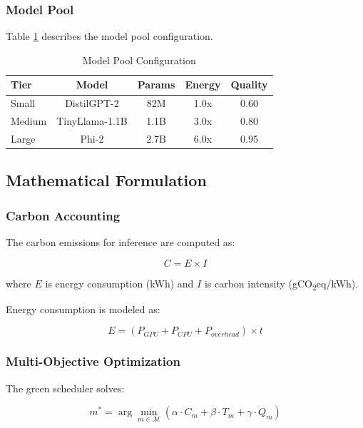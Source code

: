 \documentclass[conference]{IEEEtran}
\newcommand{\gco}{gCO\textsubscript{2}eq}
\begin{document}
\subsubsection{Model Pool}

Table \ref{tab:model_pool} describes the model pool configuration.

\begin{table}[h]
\centering
\caption{Model Pool Configuration}
\label{tab:model_pool}
\begin{tabular}{lcccc}
\toprule
\textbf{Tier} & \textbf{Model} & \textbf{Params} & \textbf{Energy} & \textbf{Quality} \\
\midrule
Small & DistilGPT-2 & 82M & 1.0x & 0.60 \\
Medium & TinyLlama-1.1B & 1.1B & 3.0x & 0.80 \\
Large & Phi-2 & 2.7B & 6.0x & 0.95 \\
\bottomrule
\end{tabular}
\end{table}

\subsection{Mathematical Formulation}

\subsubsection{Carbon Accounting}

The carbon emissions for inference are computed as:

\begin{equation}
C = E \times I
\label{eq:carbon}
\end{equation}

where $E$ is energy consumption (kWh) and $I$ is carbon intensity (\gco{}/kWh).

Energy consumption is modeled as:

\begin{equation}
E = (P_{GPU} + P_{CPU} + P_{overhead}) \times t
\label{eq:energy}
\end{equation}

\subsubsection{Multi-Objective Optimization}

The green scheduler solves:

\begin{equation}
m^* = \arg\min_{m \in \mathcal{M}} \left( \alpha \cdot C_m + \beta \cdot T_m + \gamma \cdot Q_m \right)
\label{eq:objective}
\end{equation}
\end{document}

